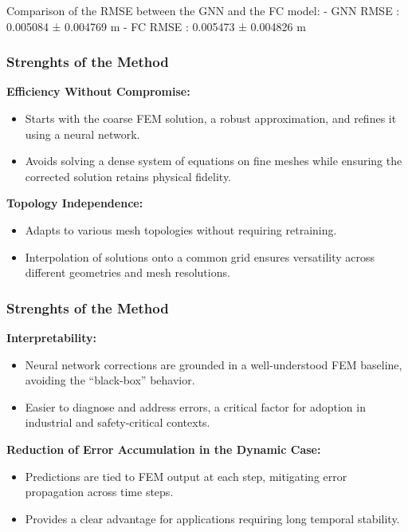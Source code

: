 \documentclass{beamer}
\begin{document}
Comparison of the RMSE between the GNN and the FC model:
        - GNN RMSE : 0.005084 ± 0.004769 m
        - FC RMSE : 0.005473 ± 0.004826 m
\fi

\begin{frame}
    \frametitle{Strenghts of the Method}
    \textbf{Efficiency Without Compromise:}
    \begin{itemize}
        \item Starts with the coarse FEM solution, a robust approximation, and refines it using a neural network.
        \item Avoids solving a dense system of equations on fine meshes while ensuring the corrected solution retains physical fidelity.
    \end{itemize}
    \textbf{Topology Independence:}
    \begin{itemize}
        \item Adapts to various mesh topologies without requiring retraining.
        \item Interpolation of solutions onto a common grid ensures versatility across different geometries and mesh resolutions.
    \end{itemize}
\end{frame}

\begin{frame}
    \frametitle{Strenghts of the Method}
    \textbf{Interpretability:}
    \begin{itemize}
        \item Neural network corrections are grounded in a well-understood FEM baseline, avoiding the “black-box” behavior.
        \item Easier to diagnose and address errors, a critical factor for adoption in industrial and safety-critical contexts.
    \end{itemize}
    \textbf{Reduction of Error Accumulation in the Dynamic Case:}
    \begin{itemize}
        \item Predictions are tied to FEM output at each step, mitigating error propagation across time steps.
        \item Provides a clear advantage for applications requiring long temporal stability.
    \end{itemize}
\end{frame}
\end{document}
